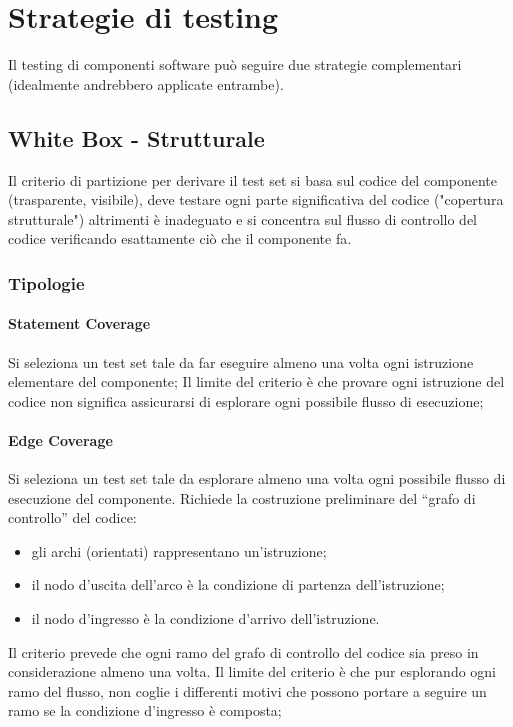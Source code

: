\section{Strategie di testing}

Il testing di componenti software può seguire due strategie complementari (idealmente andrebbero applicate entrambe).

\subsection{White Box - Strutturale}

Il criterio di partizione per derivare il test set si basa sul codice del componente (trasparente, visibile), deve testare ogni parte significativa del codice ("copertura strutturale") altrimenti è inadeguato e si concentra sul flusso di controllo del codice verificando esattamente ciò che il componente fa.

\subsubsection{Tipologie}

\paragraph{Statement Coverage} Si seleziona un test set tale da far eseguire almeno una volta ogni istruzione elementare del componente; Il limite del criterio è che provare ogni istruzione del codice non significa assicurarsi di esplorare ogni possibile flusso di esecuzione; 
   
\paragraph{Edge Coverage} Si seleziona un test set tale da esplorare almeno una volta ogni possibile flusso di esecuzione del componente. Richiede la costruzione preliminare del “grafo di controllo” del codice: 
\begin{itemize}
	   \item gli archi (orientati) rappresentano un'istruzione; 
	   \item il nodo d'uscita dell'arco è la condizione di partenza dell'istruzione;
	   \item il nodo d'ingresso è la condizione d'arrivo dell'istruzione. 
\end{itemize}
Il criterio prevede che ogni ramo del grafo di controllo del codice sia preso in considerazione almeno una volta. Il limite del criterio è che pur esplorando ogni ramo del flusso, non coglie i differenti motivi che possono portare a seguire un ramo se la condizione d'ingresso è composta; 
   
